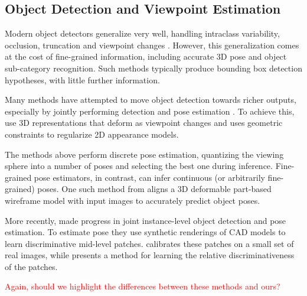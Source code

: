 \documentclass[10pt,twocolumn,letterpaper]{article}
\begin{document}
\subsection{Object Detection and Viewpoint Estimation}

Modern object detectors generalize very well, handling intraclass variability, occlusion, truncation and viewpoint changes \cite{Felzenszwalb10, Girshick14}. However, this generalization comes at the cost of fine-grained information, including accurate 3D pose and object sub-category recognition. Such methods typically produce bounding box detection hypotheses, with little further information.

Many methods have attempted to move object detection towards richer outputs, especially by jointly performing detection and pose estimation \cite{Pepik12, Xiang12, Fidler12, Xiang14, Hejrati14, Aubry14, Lim14}. To achieve this, \cite{Xiang12, Hejrati14, Fidler12} use 3D representations that deform as viewpoint changes and \cite{Pepik12} uses geometric constraints to regularize 2D appearance models.

The methods above perform discrete pose estimation, quantizing the viewing sphere into a number of poses and selecting the best one during inference. Fine-grained pose estimators, in contrast, can infer continuous (or arbitrarily fine-grained) poses. One such method from \cite{Zia13} aligns a 3D deformable part-based wireframe model with input images to accurately predict object poses.

More recently, \cite{Aubry14, Lim14} made progress in joint instance-level object detection and pose estimation. To estimate pose they use synthetic renderings of CAD models to learn discriminative mid-level patches. \cite{Aubry14} calibrates these patches on a small set of real images, while \cite{Lim14} presents a method for learning the relative discriminativeness of the patches.

\textcolor{red}{Again, should we highlight the differences between these methods and ours?}
\end{document}
